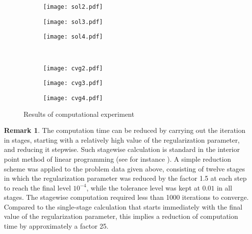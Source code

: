 \documentclass{article}
\theoremstyle{definition}
\newtheorem{remark}[theorem]{Remark}
\begin{document}
\begin{figure}
\begin{subfigure}[b]{.3\linewidth}
\texttt{[image: sol2.pdf]}
\end{subfigure}
\begin{subfigure}[b]{.3\linewidth}
\texttt{[image: sol3.pdf]}
\end{subfigure}
\begin{subfigure}[b]{.3\linewidth}
\texttt{[image: sol4.pdf]}
\end{subfigure}
\\
\begin{subfigure}[b]{.3\linewidth}
\texttt{[image: cvg2.pdf]}
\end{subfigure}
\begin{subfigure}[b]{.3\linewidth}
\texttt{[image: cvg3.pdf]}
\end{subfigure}
\begin{subfigure}[b]{.3\linewidth}
\texttt{[image: cvg4.pdf]}
\end{subfigure}
\caption{Results of computational experiment \label{results}}
\end{figure}

\begin{remark}
The computation time can be reduced by carrying out the iteration in stages, starting with a relatively high value of the regularization parameter, and reducing it stepwise. Such stagewise calculation is standard in the interior point method of linear programming (see for instance \cite{Wright}). A simple reduction scheme was applied to the problem data given above, consisting of twelve stages in which the regularization parameter was reduced
by the factor 1.5 at each step to reach the final level $10^{-4}$, while the tolerance level was kept at $0.01$ in
all stages. The stagewise computation required less than 1000 iterations to converge. Compared to the single-stage calculation that starts immediately with the final
value of the regularization parameter, this implies a reduction of computation time by approximately a factor 25.
\end{remark}
\end{document}
